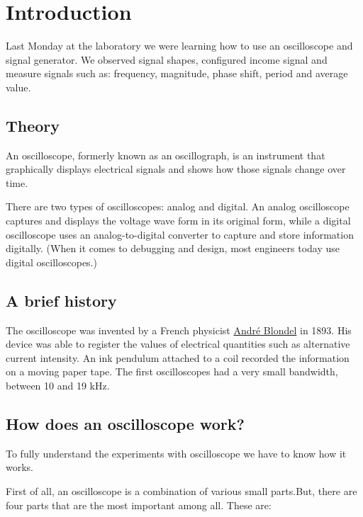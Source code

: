 \section{Introduction}

Last Monday at the laboratory we were learning how to use an oscilloscope and signal generator. We observed signal shapes, configured income signal and measure signals such as: frequency, magnitude, phase shift, period and average value.

\subsection*{Theory}

An oscilloscope, formerly known as an oscillograph, is an instrument that graphically displays electrical signals and shows how those signals change over time.

There are two types of oscilloscopes: analog and digital. An analog oscilloscope captures and displays the voltage wave form in its original form, while a digital oscilloscope uses an analog-to-digital converter to capture and store information digitally. (When it comes to debugging and design, most engineers today use digital oscilloscopes.)

\subsection*{A brief history}

The oscilloscope was invented by a French physicist \href{https://en.wikipedia.org/wiki/Andr%C3%A9_Blondel}{André Blondel} in 1893. His device was able to register the values of electrical quantities such as alternative current intensity. An ink pendulum attached to a coil recorded the information on a moving paper tape. The first oscilloscopes had a very small bandwidth, between 10 and 19 kHz.

\subsection*{How does an oscilloscope work?}

To fully understand the experiments with oscilloscope we have to know how it works.

First of all, an oscilloscope is a combination of various small parts.But, there are four parts that are the most important among all. These are:

